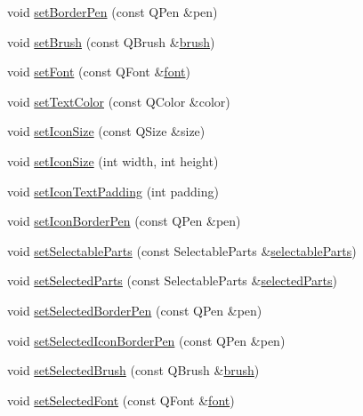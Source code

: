 \begin{DoxyCompactItemize}
\item 
void \hyperlink{class_q_c_p_legend_a866a9e3f5267de7430a6c7f26a61db9f}{set\-Border\-Pen} (const Q\-Pen \&pen)
\item 
void \hyperlink{class_q_c_p_legend_a497bbcd38baa3598c08e2b3f48103f23}{set\-Brush} (const Q\-Brush \&\hyperlink{class_q_c_p_legend_a7e5d2766e7d724f399022be8a4e8a2cb}{brush})
\item 
void \hyperlink{class_q_c_p_legend_aa4cda8499e3cb0f3be415edc02984c73}{set\-Font} (const Q\-Font \&\hyperlink{class_q_c_p_legend_a5cf8b840bc02f7bf4edb8dde400d0f41}{font})
\item 
void \hyperlink{class_q_c_p_legend_ae1eb239ff4a4632fe1b6c3e668d845c6}{set\-Text\-Color} (const Q\-Color \&color)
\item 
void \hyperlink{class_q_c_p_legend_a8b0740cce488bf7010da6beda6898984}{set\-Icon\-Size} (const Q\-Size \&size)
\item 
void \hyperlink{class_q_c_p_legend_a96b1a37fd4ee6a9778e6e54fe56ab6c2}{set\-Icon\-Size} (int width, int height)
\item 
void \hyperlink{class_q_c_p_legend_a62973bd69d5155e8ea3141366e8968f6}{set\-Icon\-Text\-Padding} (int padding)
\item 
void \hyperlink{class_q_c_p_legend_a2f2c93d18a651f4ff294bb3f026f49b8}{set\-Icon\-Border\-Pen} (const Q\-Pen \&pen)
\item 
void \hyperlink{class_q_c_p_legend_a9ce60aa8bbd89f62ae4fa83ac6c60110}{set\-Selectable\-Parts} (const Selectable\-Parts \&\hyperlink{class_q_c_p_legend_aa90c7fdbad7a0e93527bafb1f1f49a43}{selectable\-Parts})
\item 
void \hyperlink{class_q_c_p_legend_a2aee309bb5c2a794b1987f3fc97f8ad8}{set\-Selected\-Parts} (const Selectable\-Parts \&\hyperlink{class_q_c_p_legend_abbbf1b2d6a149013527ed87b0780894a}{selected\-Parts})
\item 
void \hyperlink{class_q_c_p_legend_a2c35d262953a25d96b6112653fbefc88}{set\-Selected\-Border\-Pen} (const Q\-Pen \&pen)
\item 
void \hyperlink{class_q_c_p_legend_ade93aabe9bcccaf9cf46cec22c658027}{set\-Selected\-Icon\-Border\-Pen} (const Q\-Pen \&pen)
\item 
void \hyperlink{class_q_c_p_legend_a875227f3219c9799464631dec5e8f1bd}{set\-Selected\-Brush} (const Q\-Brush \&\hyperlink{class_q_c_p_legend_a7e5d2766e7d724f399022be8a4e8a2cb}{brush})
\item 
void \hyperlink{class_q_c_p_legend_ab580a01c3c0a239374ed66c29edf5ad2}{set\-Selected\-Font} (const Q\-Font \&\hyperlink{class_q_c_p_legend_a5cf8b840bc02f7bf4edb8dde400d0f41}{font})

\end{DoxyCompactItemize}
